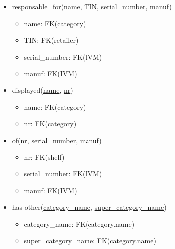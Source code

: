 \documentclass[12pt,a4paper]{report}
\begin{document}
\begin{itemize}
\item responsable\_for(\underline{name}, \underline{TIN}, \underline{serial\_number}, \underline{manuf})
  \begin{itemize}
  \item name: FK(category)
  \item TIN: FK(retailer)
  \item serial\_number: FK(IVM)
  \item manuf: FK(IVM)
  \end{itemize}
  
\item displayed(\underline{name}, \underline{nr})
  \begin{itemize}
  \item name: FK(category)
  \item nr: FK(category)
  \end{itemize}

\item of(\underline{nr}, \underline{serial\_number}, \underline{manuf})
  \begin{itemize}
  \item nr: FK(shelf)
  \item serial\_number: FK(IVM)
  \item manuf: FK(IVM)
  \end{itemize}

\item has-other(\underline{category\_name}, \underline{super\_category\_name})
  \begin{itemize}
  \item category\_name: FK(category.name)
  \item super\_category\_name: FK(category.name)
  \end{itemize}

\end{itemize}



\end{document}
